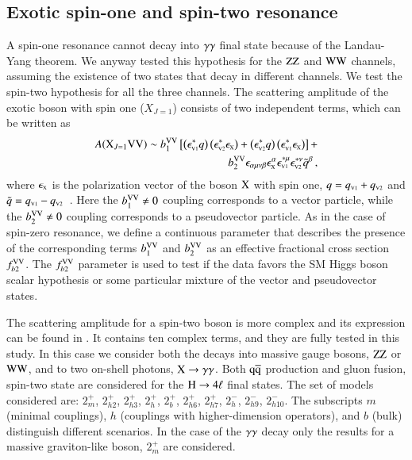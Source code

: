 \subsection{Exotic spin-one and spin-two resonance}
A spin-one resonance cannot decay into $\gamma\gamma$ final state because
of the Landau-Yang theorem. We anyway tested this hypothesis for the
$\mathrm{Z}\mathrm{Z}$ and $\mathrm{W}\mathrm{W}$ channels, assuming the existence of two states
that decay in different channels. We test the spin-two hypothesis for
all the three channels.  The scattering amplitude of the exotic boson
with spin one ($X_{J=1}$) consists of two independent terms, which can
be written as
%
\begin{eqnarray}
A(\mathrm{X}_{J=1} \mathrm{V}\mathrm{V}) \sim b_{1}^{\mathrm{V}\mathrm{V}}  \left[ \left(\epsilon_{\scriptscriptstyle\mathrm{V}1}^{*}q\right)\left(\epsilon_{\scriptscriptstyle\mathrm{V}2}^{*}\epsilon_{\scriptscriptstyle\mathrm{X}}\right) +
\left(\epsilon_{\scriptscriptstyle\mathrm{V}2}^{*}q\right)\left(\epsilon_{\scriptscriptstyle\mathrm{V}1}^{*}\epsilon_{\scriptscriptstyle\mathrm{X}}\right) \right] + \\ \nonumber 
b_{2}^{\mathrm{V}\mathrm{V}}  \epsilon_{\alpha\mu\nu\beta}\epsilon_{\scriptscriptstyle\mathrm{X}}^{\alpha}\epsilon_{\scriptscriptstyle\mathrm{V}1}^{*\mu}\epsilon_{\scriptscriptstyle\mathrm{V}2}^{*\nu}{\tilde q}^{\beta} \,,
\label{eq:ampl-spin1} 
\end{eqnarray}
%
where $\epsilon_{\scriptscriptstyle\mathrm{X}}$ is the polarization vector of the boson $\mathrm{X}$
with spin one, ${q}=q_{\scriptscriptstyle\mathrm{V}1}+q_{\scriptscriptstyle\mathrm{V}2}$ and ${\tilde
  q}=q_{\scriptscriptstyle\mathrm{V}1}-q_{\scriptscriptstyle\mathrm{V}2}$~\cite{Gao:2010qx, Bolognesi:2012mm}.
Here the $b_{1}^{\mathrm{V}\mathrm{V}} \neq 0$ coupling corresponds to a vector
particle, while the $b_{2}^{\mathrm{V}\mathrm{V}}\neq 0$ coupling corresponds to a
pseudovector particle.  As in the case of spin-zero resonance, we
define a continuous parameter that describes the presence of the
corresponding terms $b_{1}^{\mathrm{V}\mathrm{V}} $ and $b_{2}^{\mathrm{V}\mathrm{V}}$ as an effective
fractional cross section $f_{b2}^{\mathrm{V}\mathrm{V}}$.  The $f_{b2}^{\mathrm{V}\mathrm{V}}$
parameter is used to test if the data favors the SM Higgs boson scalar
hypothesis or some particular mixture of the vector and pseudovector
states.

The scattering amplitude for a spin-two boson is more complex and its
expression can be found in \cite{CMS:2014gga}.  It contains ten
complex terms, and they are fully tested in this study.  In this case
we consider both the decays into massive gauge bosons, $\mathrm{Z}\mathrm{Z}$ or
$\mathrm{W}\mathrm{W}$, and to two on-shell photons, $\mathrm{X}\to\gamma\gamma$. Both $\mathrm{\mathrm{q}\mathrm{\overline{q}}}$
production and gluon fusion, spin-two state are considered for the
$\mathrm{H}\to4\ell$ final states. The set of models considered are: $2_m^+$,
$2_{h2}^+$, $2_{h3}^+$, $2_h^+$, $2_b^+$, $2_{h6}^+$, $2_{h7}^+$,
$2_h^-$, $2_{h9}^-$, $2_{h10}^-$.  The subscripts $m$ (minimal
couplings), $h$ (couplings with higher-dimension operators), and $b$
(bulk) distinguish different scenarios.  In the case of the $\gamma\gamma$
decay only the results for a massive graviton-like boson, $2_m^+$ are
considered.
